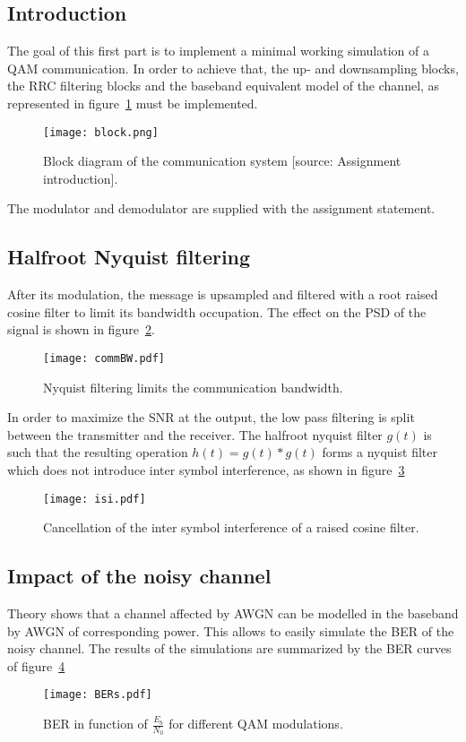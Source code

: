 \subsection{Introduction}
The goal of this first part is to implement a minimal working simulation of a QAM communication.
In order to achieve that, the up- and downsampling blocks, the RRC filtering blocks and the baseband equivalent model of the channel, as represented in figure~\ref{fig:chain} must be implemented.
\begin{figure}[htbp]
\centering
\texttt{[image: block.png]}
\caption{Block diagram of the communication system [source: Assignment introduction].\label{fig:chain}}
\end{figure}
The modulator and demodulator are supplied with the assignment statement.

\subsection{Halfroot Nyquist filtering}
After its modulation, the message is upsampled and filtered with a root raised cosine filter to limit its bandwidth occupation.
The effect on the PSD of the signal is shown in figure~\ref{fig:LPF}.
\begin{figure}[htbp]
\centering
\texttt{[image: commBW.pdf]}
\caption{Nyquist filtering limits the communication bandwidth.\label{fig:LPF}}
\end{figure}

In order to maximize the SNR at the output, the low pass filtering is split between the transmitter and the receiver.
The halfroot nyquist filter $g(t)$ is such that the resulting operation $h(t) = g(t)*g(t)$ forms a nyquist filter which does not introduce inter symbol interference, as shown in figure~\ref{fig:noISI}
\begin{figure}
\centering
\texttt{[image: isi.pdf]}
\caption{Cancellation of the inter symbol interference of a raised cosine filter.\label{fig:noISI}}
\end{figure}

\subsection{Impact of the noisy channel}
Theory shows that a channel affected by AWGN can be modelled in the baseband by AWGN of corresponding power.
This allows to easily simulate the BER of the noisy channel.
The results of the simulations are summarized by the BER curves of figure~\ref{fig:BER}
\begin{figure}[htbp]
\texttt{[image: BERs.pdf]}
\caption{BER in function of $\frac{E_b}{N_0}$ for different QAM modulations.\label{fig:BER}}
\end{figure}

